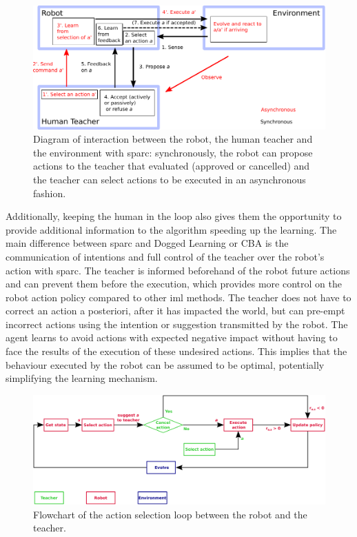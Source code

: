 \begin{figure}[ht]
	\includegraphics[width=1\linewidth]{diagram.pdf}
	\centering
	\caption{Diagram of interaction between the robot, the human teacher and the environment with \gls{sparc}: synchronously, the robot can propose actions to the teacher that evaluated (approved or cancelled) and the teacher can select actions to be executed in an asynchronous fashion.}
	\label{fig:sparc_diagram}
\end{figure}

Additionally, keeping the human in the loop also gives them the opportunity to provide additional information to the algorithm speeding up the learning. The main difference between \gls{sparc} and Dogged Learning or CBA \citep{chernova2009interactive} is the communication of intentions and full control of the teacher over the robot's action with \gls{sparc}. The teacher is informed beforehand of the robot future actions and can prevent them before the execution, which provides more control on the robot action policy compared to other \gls{iml} methods. The teacher does not have to correct an action a posteriori, after it has impacted the world, but can pre-empt incorrect actions using the intention or suggestion transmitted by the robot. The agent learns to avoid actions with expected negative impact without having to face the results of the execution of these undesired actions. This implies that the behaviour executed by the robot can be assumed to be optimal, potentially simplifying the learning mechanism.

\begin{figure}[ht]
	\includegraphics[width=1\linewidth]{flowchart.pdf}
	\centering
	\caption{Flowchart of the action selection loop between the robot and the teacher.}
	\label{fig:sparc_flowchart}
\end{figure}

